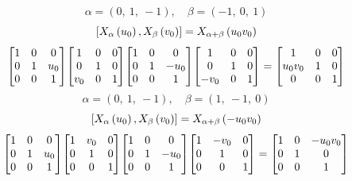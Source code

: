 \documentclass[11pt]{article}
\theoremstyle{definition}
\begin{document}
\[
\alpha = \left( 0, \  1, \  -1\right), \quad \beta = \left( -1, \  0, \  1\right)
\]
\[
\scaletoalign{\textwidth}{\left[ X_{\alpha}\left(u_{0}\right), X_{\beta}\left(v_{0}\right) \right] = X_{\alpha + \beta}\left(u_{0} v_{0}\right)}
\]
\[
\scaletoalign{\textwidth}{{\left[\begin{matrix}1 & 0 & 0\\0 & 1 & u_{0}\\0 & 0 & 1\end{matrix}\right]} {\left[\begin{matrix}1 & 0 & 0\\0 & 1 & 0\\v_{0} & 0 & 1\end{matrix}\right]} {\left[\begin{matrix}1 & 0 & 0\\0 & 1 & - u_{0}\\0 & 0 & 1\end{matrix}\right]} {\left[\begin{matrix}1 & 0 & 0\\0 & 1 & 0\\- v_{0} & 0 & 1\end{matrix}\right]} = {\left[\begin{matrix}1 & 0 & 0\\u_{0} v_{0} & 1 & 0\\0 & 0 & 1\end{matrix}\right]}}
\]
\[
\alpha = \left( 0, \  1, \  -1\right), \quad \beta = \left( 1, \  -1, \  0\right)
\]
\[
\scaletoalign{\textwidth}{\left[ X_{\alpha}\left(u_{0}\right), X_{\beta}\left(v_{0}\right) \right] = X_{\alpha + \beta}\left(- u_{0} v_{0}\right)}
\]
\[
\scaletoalign{\textwidth}{{\left[\begin{matrix}1 & 0 & 0\\0 & 1 & u_{0}\\0 & 0 & 1\end{matrix}\right]} {\left[\begin{matrix}1 & v_{0} & 0\\0 & 1 & 0\\0 & 0 & 1\end{matrix}\right]} {\left[\begin{matrix}1 & 0 & 0\\0 & 1 & - u_{0}\\0 & 0 & 1\end{matrix}\right]} {\left[\begin{matrix}1 & - v_{0} & 0\\0 & 1 & 0\\0 & 0 & 1\end{matrix}\right]} = {\left[\begin{matrix}1 & 0 & - u_{0} v_{0}\\0 & 1 & 0\\0 & 0 & 1\end{matrix}\right]}}
\]
\end{document}
